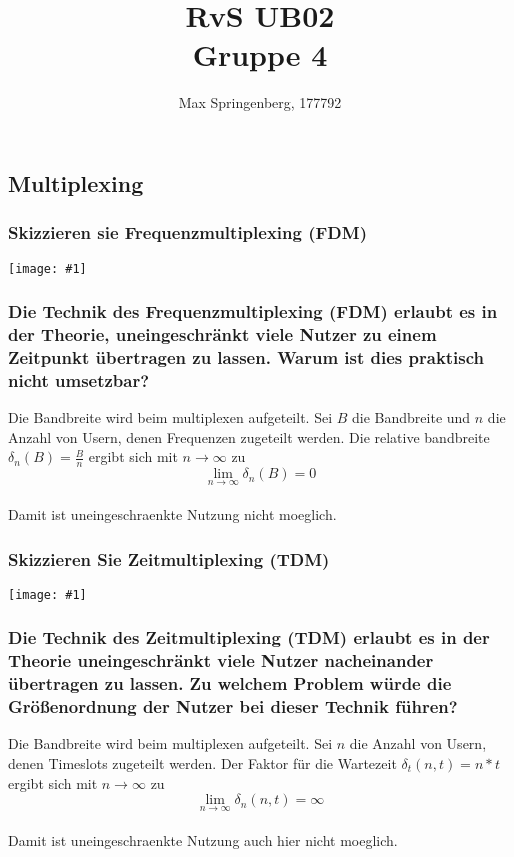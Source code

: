 \documentclass{article}
\author{Max Springenberg, 177792}
\title{
    RvS UB02\\
    Gruppe 4
}
\date{}
\newcommand{\img}[1]{\texttt{[image: \#1]}}
\begin{document}
\maketitle
\newpage

\subsection{Multiplexing}

\subsubsection{Skizzieren sie Frequenzmultiplexing (FDM)}
\img{FreqMult.png}

\subsubsection{
    Die Technik des Frequenzmultiplexing (FDM) erlaubt es in der 
    Theorie, uneingeschränkt viele Nutzer zu einem Zeitpunkt 
    übertragen zu lassen. Warum ist dies praktisch nicht umsetzbar?
}
Die Bandbreite wird beim multiplexen aufgeteilt. 
Sei $B$ die Bandbreite und $n$ die Anzahl von Usern, denen Frequenzen
zugeteilt werden. Die relative bandbreite $\delta_n(B) = \frac{B}{n}$
ergibt sich mit $n \to \infty$ zu
$$
\lim_{n \to \infty} \delta_n(B) = 0
$$\\
Damit ist uneingeschraenkte Nutzung nicht moeglich.\\

\subsubsection{Skizzieren Sie Zeitmultiplexing (TDM)}
\img{TimeMult.png}

\subsubsection{
    Die Technik des Zeitmultiplexing (TDM) erlaubt es in der Theorie
    uneingeschränkt viele Nutzer nacheinander übertragen zu lassen. 
    Zu welchem Problem würde die Größenordnung der Nutzer bei 
    dieser Technik führen?
}
Die Bandbreite wird beim multiplexen aufgeteilt. 
Sei $n$ die Anzahl von Usern, denen Timeslots zugeteilt werden. 
Der Faktor für die Wartezeit $\delta_t(n, t) = n * t$
ergibt sich mit $n \to \infty$ zu
$$
\lim_{n \to \infty} \delta_n(n, t) = \infty
$$\\
Damit ist uneingeschraenkte Nutzung auch hier nicht moeglich.\\
\end{document}
